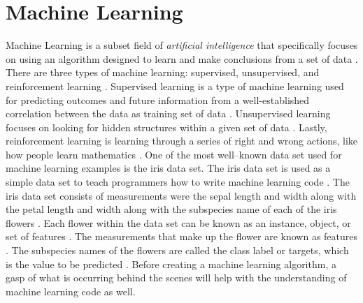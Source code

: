 \documentclass[a4paper, 12pt]{article}
\begin{document}
\section{Machine Learning}
\begin{paragraph}
\indent Machine Learning is a subset field of \textit{artificial intelligence} that specifically focuses on using an algorithm designed to learn and make conclusions from a set of data \cite{pythonML}. There are three types of machine learning: supervised, unsupervised, and reinforcement learning \cite{pythonML}. Supervised learning is a type of machine learning used for predicting outcomes and future information from a well-established correlation between the data as training set of data \cite{pythonML}. Unsupervised learning focuses on looking for hidden structures within a given set of data \cite{pythonML}. Lastly, reinforcement learning is learning through a series of right and wrong actions, like how people learn mathematics \cite{pythonML}. One of the most well--known data set used for machine learning examples is the iris data set. The iris data set is used as a simple data set to teach programmers how to write machine learning code \cite{pythonML}. The iris data set consists of measurements were the sepal length and width along with the petal length and width along with the subspecies name of each of the iris flowers \cite{pythonML}. Each flower within the data set can be known as an instance, object, or set of features \cite{pythonML}. The measurements that make up the flower are known as features \cite{pythonML}. The subspecies names of the flowers are called the class label or targets, which is the value to be predicted \cite{pythonML}.  Before creating a machine learning algorithm, a gasp of what is occurring behind the scenes will help with the understanding of machine learning code as well.
\end{paragraph}
\end{document}
